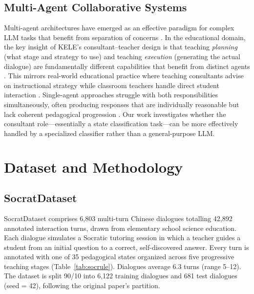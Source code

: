 \documentclass[11pt]{article}
\begin{document}
\subsection{Multi-Agent Collaborative Systems}

Multi-agent architectures have emerged as an effective paradigm for complex LLM tasks that benefit from separation of concerns \citep{ge2023openagi}. In the educational domain, the key insight of KELE's consultant--teacher design is that teaching \emph{planning} (what stage and strategy to use) and teaching \emph{execution} (generating the actual dialogue) are fundamentally different capabilities that benefit from distinct agents \citep{peng2025kele}. This mirrors real-world educational practice where teaching consultants advise on instructional strategy while classroom teachers handle direct student interaction \citep{nevin2009collaborative}. Single-agent approaches struggle with both responsibilities simultaneously, often producing responses that are individually reasonable but lack coherent pedagogical progression \citep{an2024llmcontext}. Our work investigates whether the consultant role---essentially a state classification task---can be more effectively handled by a specialized classifier rather than a general-purpose LLM.

\section{Dataset and Methodology}

\subsection{SocratDataset}

SocratDataset \citep{peng2025kele} comprises 6,803 multi-turn Chinese dialogues totalling 42,892 annotated interaction turns, drawn from elementary school science education. Each dialogue simulates a Socratic tutoring session in which a teacher guides a student from an initial question to a correct, self-discovered answer. Every turn is annotated with one of 35 pedagogical states organized across five progressive teaching stages (Table~\ref{tab:socrule}). Dialogues average 6.3 turns (range 5--12). The dataset is split 90/10 into 6,122 training dialogues and 681 test dialogues (seed = 42), following the original paper's partition.
\end{document}
